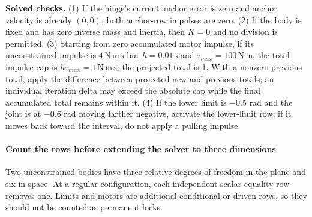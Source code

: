 \textbf{Solved checks.} (1) If the hinge's current anchor error is zero and anchor velocity is already \((0,0)\), both anchor-row impulses are zero. (2) If the body is fixed and has zero inverse mass and inertia, then \(K=0\) and no division is permitted. (3) Starting from zero accumulated motor impulse, if its unconstrained impulse is \(4\,\mathrm{N\,m\,s}\) but \(h=0.01\,\mathrm s\) and \(\tau_{max}=100\,\mathrm{N\,m}\), the total impulse cap is \(h\tau_{max}=1\,\mathrm{N\,m\,s}\); the projected total is 1. With a nonzero previous total, apply the difference between projected new and previous totals; an individual iteration delta may exceed the absolute cap while the final accumulated total remains within it. (4) If the lower limit is \(-0.5\) rad and the joint is at \(-0.6\) rad moving farther negative, activate the lower-limit row; if it moves back toward the interval, do not apply a pulling impulse.

\paragraph{Count the rows before extending the solver to three dimensions}\label{06-engine-ii-ch033-count-the-rows-before-extending-the-solver-to-three-dimensions}

\hypertarget{06-engine-ii-ch033-count-the-rows-before-extending-the-solver-to-three-dimensions}{}

Two unconstrained bodies have three relative degrees of freedom in the plane and six in space. At a regular configuration, each independent scalar equality row removes one. Limits and motors are additional conditional or driven rows, so they should not be counted as permanent locks.

